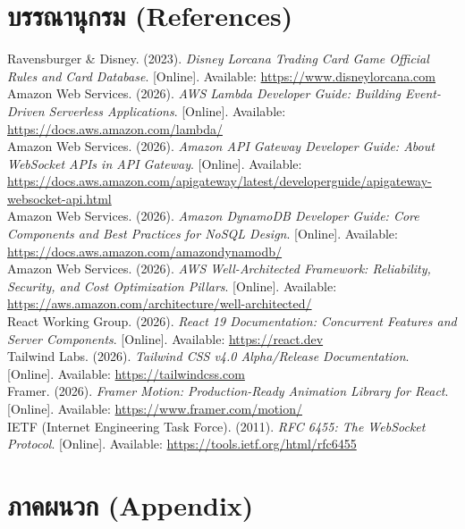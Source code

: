 \documentclass[12pt,a4paper]{report}
\begin{document}
\chapter*{บรรณานุกรม (References)}

\noindent [1] Ravensburger \& Disney. (2023). \textit{Disney Lorcana Trading Card Game Official Rules and Card Database}. [Online]. Available: \url{https://www.disneylorcana.com}\\[0.3cm]
\noindent [2] Amazon Web Services. (2026). \textit{AWS Lambda Developer Guide: Building Event-Driven Serverless Applications}. [Online]. Available: \url{https://docs.aws.amazon.com/lambda/}\\[0.3cm]
\noindent [3] Amazon Web Services. (2026). \textit{Amazon API Gateway Developer Guide: About WebSocket APIs in API Gateway}. [Online]. Available: \url{https://docs.aws.amazon.com/apigateway/latest/developerguide/apigateway-websocket-api.html}\\[0.3cm]
\noindent [4] Amazon Web Services. (2026). \textit{Amazon DynamoDB Developer Guide: Core Components and Best Practices for NoSQL Design}. [Online]. Available: \url{https://docs.aws.amazon.com/amazondynamodb/}\\[0.3cm]
\noindent [5] Amazon Web Services. (2026). \textit{AWS Well-Architected Framework: Reliability, Security, and Cost Optimization Pillars}. [Online]. Available: \url{https://aws.amazon.com/architecture/well-architected/}\\[0.3cm]
\noindent [6] React Working Group. (2026). \textit{React 19 Documentation: Concurrent Features and Server Components}. [Online]. Available: \url{https://react.dev}\\[0.3cm]
\noindent [7] Tailwind Labs. (2026). \textit{Tailwind CSS v4.0 Alpha/Release Documentation}. [Online]. Available: \url{https://tailwindcss.com}\\[0.3cm]
\noindent [8] Framer. (2026). \textit{Framer Motion: Production-Ready Animation Library for React}. [Online]. Available: \url{https://www.framer.com/motion/}\\[0.3cm]
\noindent [9] IETF (Internet Engineering Task Force). (2011). \textit{RFC 6455: The WebSocket Protocol}. [Online]. Available: \url{https://tools.ietf.org/html/rfc6455}

\chapter*{ภาคผนวก (Appendix)}
\end{document}
